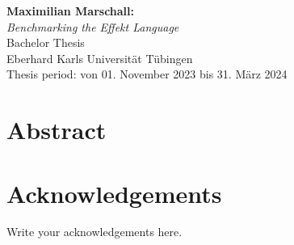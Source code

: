 \documentclass[a4paper,UKenglish,compactauthor]{lipics-v2021}
\newcommand{\authorName}{Maximilian Marschall}
\newcommand{\thesisTitle}{Benchmarking the Effekt Language}
\begin{document}

\thispagestyle{empty}
\vspace*{\fill}
\begin{minipage}{11.2cm}
\textbf{\authorName:}\\
\emph{\thesisTitle}\\ Bachelor Thesis\\
Eberhard Karls Universität Tübingen\\
Thesis period: von 01. November 2023 bis 31. März 2024
\end{minipage}
\newpage


\setcounter{page}{1}


\section*{Abstract}

\newpage

\section*{Acknowledgements}

Write your acknowledgements here.

\cleardoublepage



\small\normalsize
{} %
\tableofcontents
{}
\end{document}
